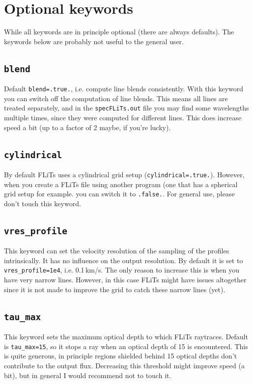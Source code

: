 \documentclass[12pt]{article}
\begin{document}
\section{Optional keywords}

While all keywords are in principle optional (there are always defaults). The keywords below are probably not useful to the general user.

\subsection*{\texttt{blend}}

Default \texttt{blend=.true.}, i.e. compute line blends consistently. With this keyword you can switch off the computation of line blends. This means all lines are treated separately, and in the \texttt{specFLiTs.out} file you may find some wavelengths multiple times, since they were computed for different lines. This does increase speed a bit (up to a factor of 2 maybe, if you're lucky).

\subsection*{\texttt{cylindrical}}

By default FLiTs uses a cylindrical grid setup (\texttt{cylindrical=.true.}). However, when you create a FLiTs file using another program (one that has a spherical grid setup for example. you can switch it to \texttt{.false.}. For general use, please don't touch this keyword. 

\subsection*{\texttt{vres\_profile}}

This keyword can set the velocity resolution of the sampling of the profiles intrinsically. It has no influence on the output resolution. By default it is set to \texttt{vres\_profile=1e4}, i.e. 0.1\,km/s. The only reason to increase this is when you have very narrow lines. However, in this case FLiTs might have issues altogether since it is not made to improve the grid to catch these narrow lines (yet).

\subsection*{\texttt{tau\_max}}

This keyword sets the maximum optical depth to which FLiTs raytraces. Default is \texttt{tau\_max=15}, so it stops a ray when an optical depth of 15 is encountered. This is quite generous, in principle regions shielded behind 15 optical depths don't contribute to the output flux. Decreasing this threshold might improve speed (a bit), but in general I would recommend not to touch it.
\end{document}
